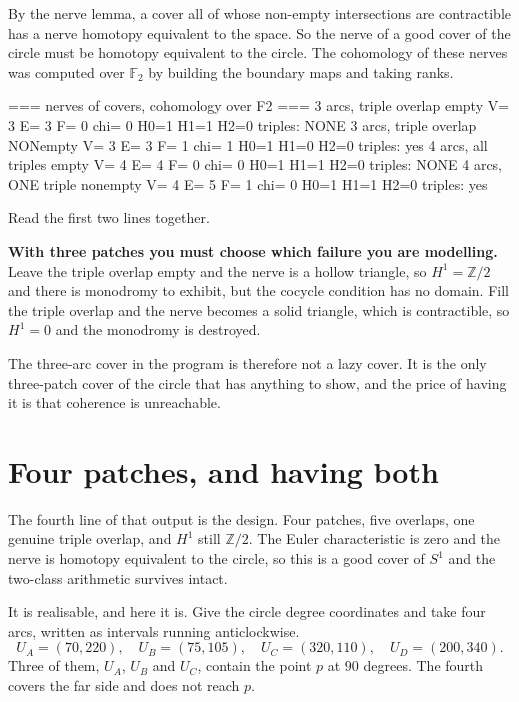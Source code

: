 \documentclass[11pt,a4paper]{article}
\begin{document}
By the nerve lemma, a cover all of whose non-empty intersections are
contractible has a nerve homotopy equivalent to the space. So the nerve of a
good cover of the circle must be homotopy equivalent to the circle. The
cohomology of these nerves was computed over $\mathbb{F}_2$ by building the
boundary maps and taking ranks.

\begin{term}
=== nerves of covers, cohomology over F2 ===
  3 arcs, triple overlap empty       V=  3 E=  3 F=  0  chi=  0   H0=1 H1=1 H2=0   triples: NONE
  3 arcs, triple overlap NONempty    V=  3 E=  3 F=  1  chi=  1   H0=1 H1=0 H2=0   triples: yes
  4 arcs, all triples empty          V=  4 E=  4 F=  0  chi=  0   H0=1 H1=1 H2=0   triples: NONE
  4 arcs, ONE triple nonempty        V=  4 E=  5 F=  1  chi=  0   H0=1 H1=1 H2=0   triples: yes
\end{term}

Read the first two lines together.

\begin{sectionbox}
\textbf{With three patches you must choose which failure you are modelling.}
Leave the triple overlap empty and the nerve is a hollow triangle, so
$H^1 = \mathbb{Z}/2$ and there is monodromy to exhibit, but the cocycle
condition has no domain. Fill the triple overlap and the nerve becomes a solid
triangle, which is contractible, so $H^1 = 0$ and the monodromy is destroyed.

The three-arc cover in the program is therefore not a lazy cover. It is the
only three-patch cover of the circle that has anything to show, and the price
of having it is that coherence is unreachable.
\end{sectionbox}

\section{Four patches, and having both}

The fourth line of that output is the design. Four patches, five overlaps, one
genuine triple overlap, and $H^1$ still $\mathbb{Z}/2$. The Euler
characteristic is zero and the nerve is homotopy equivalent to the circle, so
this is a good cover of $S^1$ and the two-class arithmetic survives intact.

It is realisable, and here it is. Give the circle degree coordinates and take
four arcs, written as intervals running anticlockwise.
\[
  U_A = (70, 220), \quad
  U_B = (75, 105), \quad
  U_C = (320, 110), \quad
  U_D = (200, 340).
\]
Three of them, $U_A$, $U_B$ and $U_C$, contain the point $p$ at $90$ degrees.
The fourth covers the far side and does not reach $p$.
\end{document}
